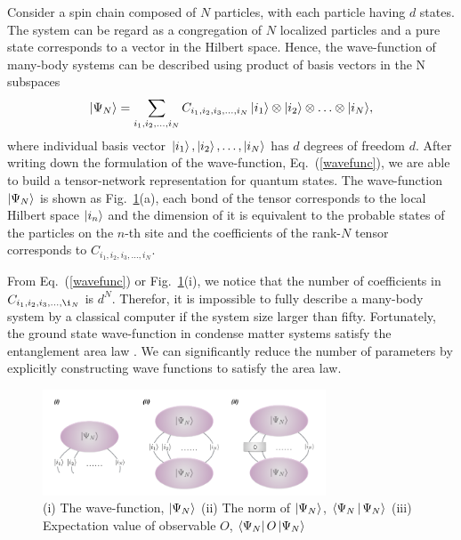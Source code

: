 Consider a spin chain composed of $N$ particles, with each particle having $d$ states. The system can be regard as a congregation of $N$ localized particles and a pure state corresponds to a vector in the Hilbert space. Hence, the wave-function of many-body systems can be described using product of basis vectors in the N subspaces
\begin{align}
	\Ket{\Psi_{N}} =\sum_{i_1,i_2,\ldots,i_N}{C_{i_1,i_2,i_3,\ldots,i_N}\Ket{i_1}\otimes\Ket{i_2}\otimes \ldots \otimes \Ket{i_N}},
	\label{wavefunc}
\end{align}
where individual basis vector $\Ket{i_1}, \Ket{i_2},\ldots, \Ket{i_N}$ has $d$ degrees of freedom $d$. After writing down the formulation of the wave-function, Eq.~(\ref{wavefunc}), we are able to build a tensor-network representation for quantum states. The wave-function $\Ket{\Psi_N}$ is shown as Fig.~\ref{fig225}(a), each bond of the tensor corresponds to the local Hilbert space $\Ket{i_n}$ and the dimension of it is equivalent to the probable states of the particles on the $n$-th site and the coefficients of the rank-$N$ tensor corresponds to $C_{i_1,i_2,i_3,\ldots,i_N}$.

From Eq.~(\ref{wavefunc}) or Fig.~\ref{fig225}(i), we notice that the number of coefficients in $C_{i_1,i_2,i_3,\ldots,\i_N}$ is $d^N$. Therefor, it is impossible to fully describe a many-body system by a classical computer if the system size larger than fifty. Fortunately, the ground state wave-function in condense matter systems satisfy the entanglement area law \cite{RevModPhys.82.277}. We can significantly reduce the number of parameters by explicitly constructing wave functions to satisfy the area law.
\begin{figure}[t]
	\centering
	\includegraphics[width=0.75\textwidth]{figures/fig225.png}
	\caption[Represent wave-function of quntum states of TN]{(i) The wave-function, $\Ket{\Psi_N}$ (ii) The norm of $\Ket{\Psi_N}$, $\Braket{\Psi_N|\Psi_N}$ (iii) Expectation value of observable $O$, $\Bra{\Psi_N}O\Ket{\Psi_N}$}
	\label{fig225}
\end{figure}

